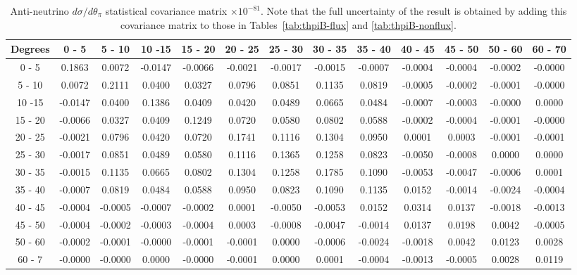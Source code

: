 \documentclass[aps,prl,twocolumn,showpacs,superscriptaddress,nofootinbib]{revtex4}
\begin{document}
\begingroup
\squeezetable
\begin{table}[h]
\tabcolsep=0.11cm
\begin{tabular}{c|cccccccccccc}
Degrees & 0 - 5 & 5 - 10 & 10 -15 & 15 - 20 & 20 - 25 & 25 - 30 & 30 - 35 & 35 - 40 & 40 - 45 & 45 - 50 & 50 - 60 & 60 - 70 \\
\hline
0 - 5 &0.1863 & 0.0072 & -0.0147 & -0.0066 & -0.0021 & -0.0017 & -0.0015 & -0.0007 & -0.0004 & -0.0004 & -0.0002 & -0.0000  \\
5 - 10 &0.0072 & 0.2111 & 0.0400 & 0.0327 & 0.0796 & 0.0851 & 0.1135 & 0.0819 & -0.0005 & -0.0002 & -0.0001 & -0.0000  \\
10 -15 &-0.0147 & 0.0400 & 0.1386 & 0.0409 & 0.0420 & 0.0489 & 0.0665 & 0.0484 & -0.0007 & -0.0003 & -0.0000 & 0.0000  \\
15 - 20 &-0.0066 & 0.0327 & 0.0409 & 0.1249 & 0.0720 & 0.0580 & 0.0802 & 0.0588 & -0.0002 & -0.0004 & -0.0001 & -0.0000  \\
20 - 25 &-0.0021 & 0.0796 & 0.0420 & 0.0720 & 0.1741 & 0.1116 & 0.1304 & 0.0950 & 0.0001 & 0.0003 & -0.0001 & -0.0001  \\
25 - 30 &-0.0017 & 0.0851 & 0.0489 & 0.0580 & 0.1116 & 0.1365 & 0.1258 & 0.0823 & -0.0050 & -0.0008 & 0.0000 & 0.0000 \\
30 - 35 &-0.0015 & 0.1135 & 0.0665 & 0.0802 & 0.1304 & 0.1258 & 0.1785 & 0.1090 & -0.0053 & -0.0047 & -0.0006 & 0.0001  \\
35 - 40 &-0.0007 & 0.0819 & 0.0484 & 0.0588 & 0.0950 & 0.0823 & 0.1090 & 0.1135 & 0.0152 & -0.0014 & -0.0024 & -0.0004  \\
40 - 45 &-0.0004 & -0.0005 & -0.0007 & -0.0002 & 0.0001 & -0.0050 & -0.0053 & 0.0152 & 0.0314 & 0.0137 & -0.0018 & -0.0013\\  
45 - 50 &-0.0004 & -0.0002 & -0.0003 & -0.0004 & 0.0003 & -0.0008 & -0.0047 & -0.0014 & 0.0137 & 0.0198 & 0.0042 & -0.0005  \\
50 - 60 &-0.0002 & -0.0001 & -0.0000 & -0.0001 & -0.0001 & 0.0000 & -0.0006 & -0.0024 & -0.0018 & 0.0042 & 0.0123 & 0.0028  \\
60 - 7 &-0.0000 & -0.0000 & 0.0000 & -0.0000 & -0.0001 & 0.0000 & 0.0001 & -0.0004 & -0.0013 & -0.0005 & 0.0028 & 0.0119 \\
  
\end{tabular}
\caption{Anti-neutrino $d\sigma/d\theta_\pi$ statistical covariance matrix  $\times 10^{-81}$.  Note that the full uncertainty of the result is obtained by adding this covariance matrix to those in Tables~\ref{tab:thpiB-flux} and \ref{tab:thpiB-nonflux}. }
\end{table}
\endgroup
\end{document}
